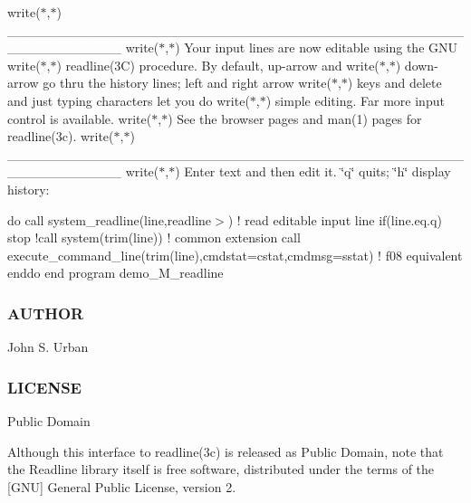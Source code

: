 write($\ast$,$\ast$)\textquotesingle{} \+\_\+\+\_\+\+\_\+\+\_\+\+\_\+\+\_\+\+\_\+\+\_\+\+\_\+\+\_\+\+\_\+\+\_\+\+\_\+\+\_\+\+\_\+\+\_\+\+\_\+\+\_\+\+\_\+\+\_\+\+\_\+\+\_\+\+\_\+\+\_\+\+\_\+\+\_\+\+\_\+\+\_\+\+\_\+\+\_\+\+\_\+\+\_\+\+\_\+\+\_\+\+\_\+\+\_\+\+\_\+\+\_\+\+\_\+\+\_\+\+\_\+\+\_\+\+\_\+\+\_\+\+\_\+\+\_\+\+\_\+\+\_\+\+\_\+\+\_\+\+\_\+\+\_\+\+\_\+\+\_\+\+\_\+\+\_\+\+\_\+\+\_\+\+\_\+\+\_\+\textquotesingle{} write($\ast$,$\ast$)\textquotesingle{} Your input lines are now editable using the G\+NU\textquotesingle{} write($\ast$,$\ast$)\textquotesingle{} readline(3\+C) procedure. By default, up-\/arrow and\textquotesingle{} write($\ast$,$\ast$)\textquotesingle{} down-\/arrow go thru the history lines; left and right arrow\textquotesingle{} write($\ast$,$\ast$)\textquotesingle{} keys and delete and just typing characters let you do\textquotesingle{} write($\ast$,$\ast$)\textquotesingle{} simple editing. Far more input control is available.\textquotesingle{} write($\ast$,$\ast$)\textquotesingle{} See the browser pages and man(1) pages for readline(3c).\textquotesingle{} write($\ast$,$\ast$)\textquotesingle{} \+\_\+\+\_\+\+\_\+\+\_\+\+\_\+\+\_\+\+\_\+\+\_\+\+\_\+\+\_\+\+\_\+\+\_\+\+\_\+\+\_\+\+\_\+\+\_\+\+\_\+\+\_\+\+\_\+\+\_\+\+\_\+\+\_\+\+\_\+\+\_\+\+\_\+\+\_\+\+\_\+\+\_\+\+\_\+\+\_\+\+\_\+\+\_\+\+\_\+\+\_\+\+\_\+\+\_\+\+\_\+\+\_\+\+\_\+\+\_\+\+\_\+\+\_\+\+\_\+\+\_\+\+\_\+\+\_\+\+\_\+\+\_\+\+\_\+\+\_\+\+\_\+\+\_\+\+\_\+\+\_\+\+\_\+\+\_\+\+\_\+\+\_\+\+\_\+\+\_\+\textquotesingle{} write($\ast$,$\ast$)\textquotesingle{} Enter text and then edit it. \char`\"{}q\char`\"{} quits; \char`\"{}h\char`\"{} display history\+:\textquotesingle{}

do call system\+\_\+readline(line,\textquotesingle{}readline$>$\textquotesingle{}) ! read editable input line if(line.\+eq.\textquotesingle{}q\textquotesingle{}) stop !call system(trim(line)) ! common extension call execute\+\_\+command\+\_\+line(trim(line),cmdstat=cstat,cmdmsg=sstat) ! f08 equivalent enddo end program demo\+\_\+\+M\+\_\+readline \subsubsection*{A\+U\+T\+H\+OR}

John S. Urban \subsubsection*{L\+I\+C\+E\+N\+SE}

Public Domain

Although this interface to readline(3c) is released as Public Domain, note that the Readline library itself is free software, distributed under the terms of the \mbox{[}G\+NU\mbox{]} General Public License, version 2. 

